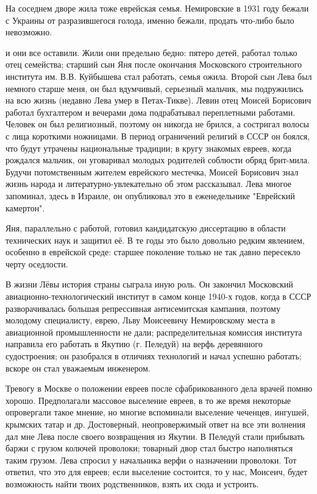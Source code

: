 На соседнем дворе жила тоже еврейская семья. Немировские в 1931 году бежали с Украины от разразившегося голода, именно бежали, продать что-либо было невозможно.

\label{160-1}
и они все оставили. Жили они предельно бедно: пятеро детей, работал только отец семейства; старший сын Яня после окончания Московского строительного института им. В.В. Куйбышева стал работать, семья ожила. Второй сын Лева был немного старше меня, он был вдумчивый, серьезный мальчик, мы подружились на всю жизнь (недавно Лева умер в Петах-Тикве). Левин отец Моисей Борисович работал бухгалтером и вечерами дома подрабатывал переплетными работами. Человек он был религиозный, поэтому он никогда не брился, а состригал волосы с лица короткими ножницами. В период ограничений религий в СССР он боялся, что будут утрачены национальные традиции; в кругу знакомых евреев, когда рождался мальчик, он уговаривал молодых родителей соблюсти обряд брит-мила. Будучи потомственным жителем еврейского местечка, Моисей Борисович знал жизнь народа и литературно-увлекательно об этом рассказывал. Лева многое запоминал, здесь в Израиле, он опубликовал это в еженедельнике "Еврейский камертон".

\label{161-1}
Яня, параллельно с работой, готовил кандидатскую диссертацию в области технических наук и защитил её. В те годы это было довольно редким явлением, особенно в еврейской среде: старшее поколение только не так давно пересекло черту оседлости.

В жизни Лёвы история страны сыграла иную роль. Он закончил Московский авиационно-технологический институт в самом конце 1940-х годов, когда в СССР разворачивалась большая репрессивная антисемитская кампания, поэтому молодому специалисту, еврею, Льву Моисеевичу Немировскому места в авиационной промышленности не дали; распределительная комиссия института направила его работать в Якутию (г. Пеледуй) на верфь деревянного судостроения; он разобрался в отличиях технологий и начал успешно работать; вскоре он стал уважаемым инженером.

\label{162-1}
Тревогу в Москве о положении евреев после сфабрикованного дела врачей помню хорошо. Предполагали массовое выселение евреев, в то же время некоторые опровергали такое мнение, но многие вспоминали выселение чеченцев, ингушей, крымских татар и др. Достоверный, неопровержимый ответ на все эти волнения дал мне Лева после своего возвращения из Якутии. В Пеледуй стали прибывать баржи с грузом колючей проволоки; товарный двор стал быстро наполняться таким грузом. Лева спросил у начальника верфи о назначении проволоки. Тот ответил, что это для евреев; если выселение состоится, то у нас, Моисеич, будет возможность найти твоих родственников, взять их сюда и устроить. 

